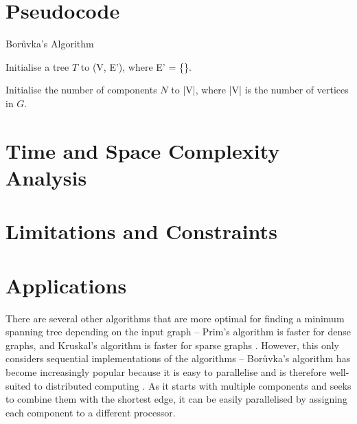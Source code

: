 \documentclass[a4paper, 11pt]{article}
\begin{document}
\section{Pseudocode}

\begin{algorithm}
    \caption{Borůvka's Algorithm}
    

    \nl Initialise a tree $T$ to (V, E'), where E' = \{\}.

    \nl Initialise the number of components $N$ to |V|, where |V| is the number of vertices in $G$.

    \nl {}
\end{algorithm}

\section{Time and Space Complexity Analysis}

\section{Limitations and Constraints}

\section{Applications}
There are several other algorithms that are more optimal for finding a minimum spanning tree depending on the input graph -- Prim's algorithm is faster for dense graphs, and Kruskal's algorithm is faster for sparse graphs \cite{bazlamaccci2001minimum}. However, this only considers sequential implementations of the algorithms -- Borůvka's algorithm has become increasingly popular because it is easy to parallelise and is therefore well-suited to distributed computing \cite{mariano2015generic}. As it starts with multiple components and seeks to combine them with the shortest edge, it can be easily parallelised by assigning each component to a different processor.
\end{document}
